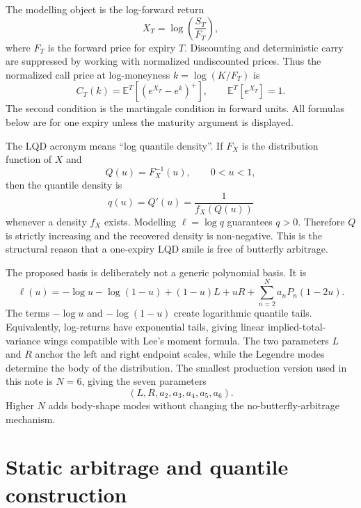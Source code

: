 \documentclass[11pt]{article}
\newcommand{\E}{\mathbb{E}}
\newcommand{\1}{\mathbf{1}}
\begin{document}
The modelling object is the log-forward return
\begin{equation}
    X_T=\log\left(\frac{S_T}{F_T}\right),
\end{equation}
where $F_T$ is the forward price for expiry $T$.  Discounting and deterministic carry are suppressed by working with normalized undiscounted prices.  Thus the normalized call price at log-moneyness $k=\log(K/F_T)$ is
\begin{equation}
    C_T(k)=\E^{T}\left[(e^{X_T}-e^k)^+\right],
    \qquad \E^T[e^{X_T}]=1.    \label{eq:call_def}
\end{equation}
The second condition is the martingale condition in forward units.  All formulas below are for one expiry unless the maturity argument is displayed.

The LQD acronym means ``log quantile density''.  If $F_X$ is the distribution function of $X$ and
\begin{equation}
    Q(u)=F_X^{-1}(u),\qquad 0<u<1,
\end{equation}
then the quantile density is
\begin{equation}
    q(u)=Q'(u)=\frac{1}{f_X(Q(u))}
\end{equation}
whenever a density $f_X$ exists.  Modelling $\ell=\log q$ guarantees $q>0$.  Therefore $Q$ is strictly increasing and the recovered density is non-negative.  This is the structural reason that a one-expiry LQD smile is free of butterfly arbitrage.

The proposed basis is deliberately not a generic polynomial basis.  It is
\begin{equation}
\boxed{
\ell(u)= -\log u-\log(1-u)+(1-u)L+uR+\sum_{n=2}^{N}a_n P_n(1-2u).
} \label{eq:lqd_main}
\end{equation}
The terms $-\log u$ and $-\log(1-u)$ create logarithmic quantile tails.  Equivalently, log-returns have exponential tails, giving linear implied-total-variance wings compatible with Lee's moment formula.  The two parameters $L$ and $R$ anchor the left and right endpoint scales, while the Legendre modes determine the body of the distribution.  The smallest production version used in this note is $N=6$, giving the seven parameters
\begin{equation}
   (L,R,a_2,a_3,a_4,a_5,a_6).
\end{equation}
Higher $N$ adds body-shape modes without changing the no-butterfly-arbitrage mechanism.

\section{Static arbitrage and quantile construction}
\end{document}
